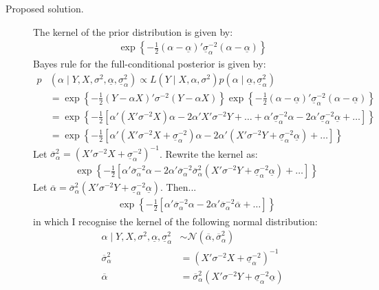 \documentclass[12pt]{article}
\begin{document}
\begin{adjustwidth}{1cm}{1cm}
\begin{description}
\bigskip\item[Proposed solution.] 
The kernel of the prior distribution is given by:
\begin{align}
\exp\left\{ -\frac{1}{2}(\alpha - \underline{\alpha})' \underline{\sigma}^{-2}_\alpha (\alpha - \underline{\alpha}) \right\}
\end{align}
Bayes rule for the full-conditional posterior is given by:
\begin{align}
p&\left(\alpha\mid Y, X, \sigma^2, \underline{\alpha}, \underline{\sigma}^2_\alpha \right) \propto L\left(Y\mid X, \alpha, \sigma^2\right) p\left(\alpha\mid\underline{\alpha}, \underline{\sigma}^2_\alpha\right)\\
&= \exp\left\{ -\frac{1}{2}(Y-\alpha X)'\sigma^{-2}(Y-\alpha X)\right\}\exp\left\{ -\frac{1}{2}(\alpha - \underline{\alpha})' \underline{\sigma}^{-2}_\alpha (\alpha - \underline{\alpha}) \right\}\\
&= \exp\left\{ -\frac{1}{2}\left[\alpha'(X'\sigma^{-2}X)\alpha - 2\alpha'X'\sigma^{-2}Y + \dots + \alpha'\underline{\sigma}^{-2}_\alpha \alpha - 2\alpha'\underline{\sigma}^{-2}_\alpha \underline{\alpha} + \dots \right]  \right\}\\
&= \exp\left\{ -\frac{1}{2}\left[\alpha'(X'\sigma^{-2}X + \underline{\sigma}^{-2}_\alpha)\alpha - 2\alpha'(X'\sigma^{-2}Y + \underline{\sigma}^{-2}_\alpha \underline{\alpha}) + \dots   \right]  \right\}
\end{align}
Let $\overline{\sigma}^2_\alpha = (X'\sigma^{-2}X + \underline{\sigma}^{-2}_\alpha)^{-1} $. Rewrite the kernel as:
\begin{align}
& \exp\left\{ -\frac{1}{2}\left[\alpha'\overline{\sigma}^{-2}_\alpha\alpha - 2\alpha'\overline{\sigma}^{-2}_\alpha \overline{\sigma}^{2}_\alpha(X'\sigma^{-2}Y + \underline{\sigma}^{-2}_\alpha \underline{\alpha}) + \dots   \right]  \right\}
\end{align}
Let $\overline{\alpha} = \overline{\sigma}^{2}_\alpha(X'\sigma^{-2}Y + \underline{\sigma}^{-2}_\alpha \underline{\alpha})$. Then...
\begin{align}
& \exp\left\{ -\frac{1}{2}\left[\alpha'\overline{\sigma}^{-2}_\alpha\alpha - 2\alpha'\overline{\sigma}^{-2}_\alpha \overline{\alpha} + \dots   \right]  \right\}
\end{align}
in which I recognise the kernel of the following normal distribution:
\begin{align}
\alpha\mid Y, X, \sigma^2, \underline{\alpha}, \underline{\sigma}^2_\alpha &\sim\mathcal{N}\left(\overline{\alpha} ,\overline{\sigma}^{2}_\alpha \right)\\[1ex]
\overline{\sigma}^{2}_\alpha &= (X'\sigma^{-2}X + \underline{\sigma}^{-2}_\alpha)^{-1}\\
\overline{\alpha} &= \overline{\sigma}^{2}_\alpha (X'\sigma^{-2}Y + \underline{\sigma}^{-2}_\alpha \underline{\alpha})
\end{align}
\end{description} 



\end{adjustwidth}
\end{document}
